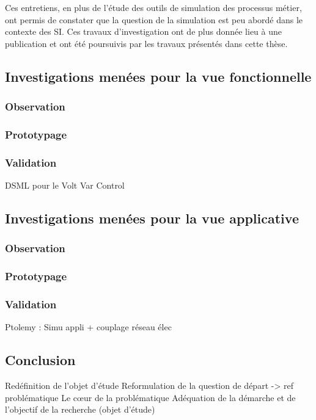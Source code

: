 			Ces entretiens, en plus de l'étude des outils de simulation des processus métier, ont permis de constater que la question de la simulation est peu abordé dans le contexte des SI. Ces travaux d'investigation ont de plus donnée lieu à une publication \cite{seghiri2012animation} et ont été poursuivis par les travaux présentés dans cette thèse. 

	
		\subsection{Investigations menées pour la vue fonctionnelle} 
			\subsubsection{Observation}
		
			\subsubsection{Prototypage}
		
			\subsubsection{Validation}
	DSML pour le Volt Var Control
		\subsection{Investigations menées pour la vue applicative} 
			\subsubsection{Observation}
		
			\subsubsection{Prototypage}
		
			\subsubsection{Validation}
	Ptolemy : Simu appli + couplage réseau élec
	
	
		\subsection{Conclusion}
Redéfinition de l'objet d'étude
Reformulation de la question de départ -> ref problématique 
Le cœur de la problématique 
Adéquation de la démarche et de l'objectif de la recherche (objet d'étude)
	
